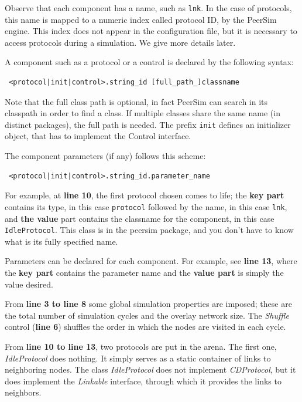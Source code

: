 \documentclass[a4paper,11pt]{article}
\begin{document}
Observe that each component has a name,
such as \texttt{lnk}. In the case of protocols, this
name is mapped to a numeric index called protocol ID, by the PeerSim
engine.
This index does not appear in the configuration file, but it is necessary
to access protocols during a simulation.
We give more details later.

A component such as a protocol or a control is declared by  the
following syntax:

\begin{verbatim} <protocol|init|control>.string_id [full_path_]classname
\end{verbatim}

Note that the full class path is optional, in fact PeerSim can search
in its classpath in order to find a class. If multiple classes share
the same name (in distinct packages), the full path is needed.
The prefix {\tt init} defines an initializer object, that has to implement
the Control interface.
  
The component parameters (if any) follows this scheme:

\begin{verbatim} <protocol|init|control>.string_id.parameter_name
\end{verbatim}

For example, at \textbf{line 10}, the first protocol chosen comes to life;
the \textbf{key part} contains its type, in this case {\tt protocol}
followed by the name, in this case {\tt lnk}, and \textbf{the
value} part contains the classname for the component, in this case
{\tt IdleProtocol}.
This class is in the peersim package, and you don't have to know what is
its fully specified name.

Parameters can be declared for each component.
For example, see \textbf{line 13}, where the \textbf{key part} contains the
parameter name and the \textbf{value part} is simply the value desired.

From \textbf{line 3 to line 8}
some global simulation properties are imposed; these are the total
number of simulation cycles and the overlay network size. The
\emph{Shuffle} control (\textbf{line 6}) shuffles the order in which the nodes
are visited in each cycle. 

From \textbf{line 10 to line 13}, two protocols are put in the arena.
The first one, \emph{IdleProtocol} does nothing.
It simply serves as a static container of links to neighboring nodes.
The class \emph{IdleProtocol} does not implement \emph{CDProtocol}, but it
does implement the \emph{Linkable} interface, through which it provides
the links to neighbors.
\end{document}

